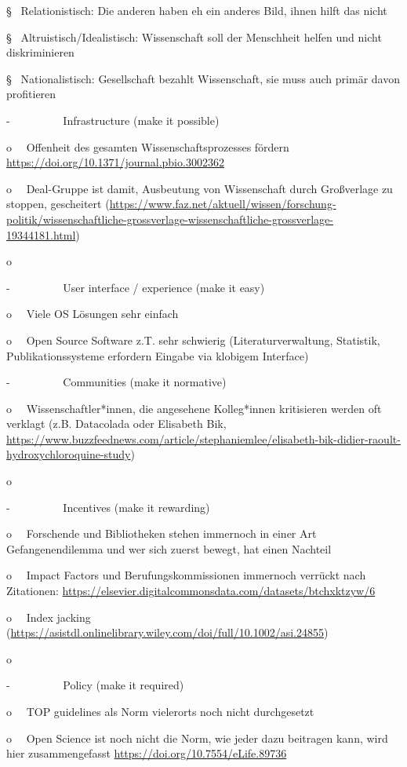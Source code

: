 \documentclass[
  letterpaper,
  DIV=11,
  numbers=noendperiod]{scrreprt}
\begin{document}
§~ Relationistisch: Die anderen haben eh ein anderes Bild, ihnen hilft
das nicht

§~ Altruistisch/Idealistisch: Wissenschaft soll der Menschheit helfen
und nicht diskriminieren

§~ Nationalistisch: Gesellschaft bezahlt Wissenschaft, sie muss auch
primär davon profitieren

-~~~~~~~~~ Infrastructure (make it possible)

o~~ Offenheit des gesamten Wissenschaftsprozesses fördern\\
\url{https://doi.org/10.1371/journal.pbio.3002362}

o~~ Deal-Gruppe ist damit, Ausbeutung von Wissenschaft durch Großverlage
zu stoppen, gescheitert
(\url{https://www.faz.net/aktuell/wissen/forschung-politik/wissenschaftliche-grossverlage-wissenschaftliche-grossverlage-19344181.html})

o~~ ~

-~~~~~~~~~ User interface / experience (make it easy)

o~~ Viele OS Lösungen sehr einfach

o~~ Open Source Software z.T. sehr schwierig (Literaturverwaltung,
Statistik, Publikationssysteme erfordern Eingabe via klobigem Interface)

-~~~~~~~~~ Communities (make it normative)

o~~ Wissenschaftler*innen, die angesehene Kolleg*innen kritisieren
werden oft verklagt (z.B. Datacolada oder Elisabeth Bik,
\url{https://www.buzzfeednews.com/article/stephaniemlee/elisabeth-bik-didier-raoult-hydroxychloroquine-study})

o~~ ~

-~~~~~~~~~ Incentives (make it rewarding)

o~~ Forschende und Bibliotheken stehen immernoch in einer Art
Gefangenendilemma und wer sich zuerst bewegt, hat einen Nachteil

o~~ Impact Factors und Berufungskommissionen immernoch verrückt nach
Zitationen:
\url{https://elsevier.digitalcommonsdata.com/datasets/btchxktzyw/6}

o~~ Index jacking
(\url{https://asistdl.onlinelibrary.wiley.com/doi/full/10.1002/asi.24855})

o~~

-~~~~~~~~~ Policy (make it required)

o~~ TOP guidelines als Norm vielerorts noch nicht durchgesetzt

o~~ Open Science ist noch nicht die Norm, wie jeder dazu beitragen kann,
wird hier zusammengefasst \url{https://doi.org/10.7554/eLife.89736}
\end{document}
